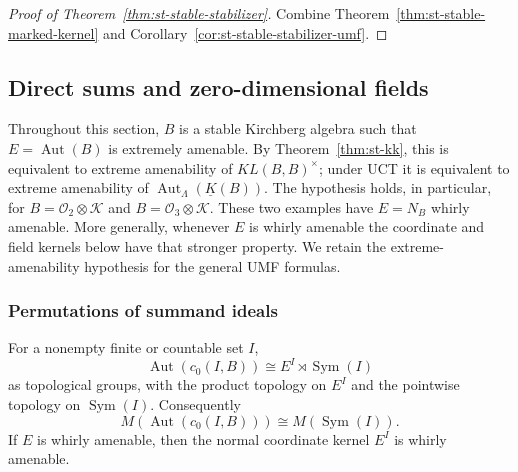 \begin{proof}[Proof of Theorem~\protect\ref{thm:st-stable-stabilizer}]
Combine Theorem~\ref{thm:st-stable-marked-kernel} and Corollary~\ref{cor:st-stable-stabilizer-umf}.
\end{proof}


\subsection{Direct sums and zero-dimensional fields}

\label{sec:st-geometric} Throughout this section, $B$ is a stable
Kirchberg algebra such that $E=\operatorname{Aut}(B)$ is extremely amenable. By Theorem~\ref{thm:st-kk}, this is equivalent to extreme amenability of $KL(B,B)^\times$; under UCT it is equivalent to extreme amenability of $\operatorname{Aut} _\Lambda(\underline K(B))$. The hypothesis holds, in particular, for $B=\mathcal{O}_2\otimes\mathcal{K}$ and $B=\mathcal{O}_3\otimes\mathcal{K}$.
These two examples have $E=N_B$ whirly amenable. More generally, whenever
$E$ is whirly amenable the coordinate and field kernels below have that
stronger property. We retain the extreme-amenability hypothesis for the
general UMF formulas.


\subsubsection{Permutations of summand ideals}

\begin{proposition}\label{prop:st-direct-sum}
 For a nonempty finite or countable set $I$, 
\begin{equation*}
\operatorname{Aut}(c_0(I,B))\cong E^I\rtimes\operatorname{Sym}(I) 
\end{equation*}
as topological groups, with the product topology on $E^I$ and the pointwise
topology on $\operatorname{Sym}(I)$. Consequently 
\begin{equation*}
M(\operatorname{Aut}(c_0(I,B)))\cong M(\operatorname{Sym}(I)).
\end{equation*}
If $E$ is whirly amenable, then the normal coordinate kernel $E^I$ is
whirly amenable.
\end{proposition}

